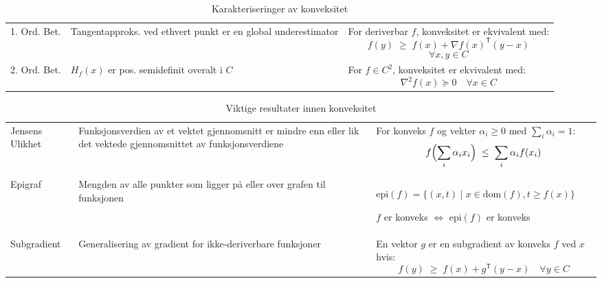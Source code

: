 \begin{table}[H]
	\centering
	\begin{tabular}{|p{3cm}|p{5cm}|p{6cm}|}
		\hline
		\rowcolor{rem-color!25}
		\multicolumn{3}{|l|}{\textbf{Karakteriseringer av Konveksitet}}                \\
		\hline
		\rowcolor{rem-color!5}
		1. Ord. Bet. & Tangentapproks. ved ethvert punkt er en global underestimator &
		For deriverbar \(f\), konveksitet er ekvivalent med:
		\[f(y)\;\ge\; f(x) + \nabla f(x)^\mathsf{T} (y - x)\]
		\[\forall x,y \in C\]                                                          \\
		\hline
		2. Ord. Bet. & \(H_f(x)\) er pos. semidefinit overalt i \(C\)                &
		For \(f \in C^2\), konveksitet er ekvivalent med:
		\[\nabla^2 f(x) \succeq 0\quad \forall x \in C\]                               \\
		\hline
	\end{tabular}
	\caption{Karakteriseringer av konveksitet}
	\label{tab:characterizations}
\end{table}

\begin{table}[H]
	\centering
	\begin{tabular}{|p{3cm}|p{5cm}|p{6cm}|}
		\hline
		\rowcolor{cor-color!25}
		\multicolumn{3}{|l|}{\textbf{Viktige Resultater}}                                                                                    \\
		\hline
		\rowcolor{cor-color!5}
		Jensens Ulikhet                                           & Funksjonsverdien av et vektet gjennomsnitt er mindre enn \newline
		eller lik det vektede gjennomsnittet av funksjonsverdiene &
		For konveks \(f\) og vekter \(\alpha_i \geq 0\) med \(\sum_i \alpha_i = 1\):
		\[f\Bigl(\sum_i \alpha_i x_i\Bigr)\;\le\;\sum_i \alpha_i f(x_i)\]                                                                    \\
		\hline
		Epigraf                                                   & Mengden av alle punkter som ligger på eller over grafen til funksjonen &
		\(\mathrm{epi}(f)=\{(x,t) \mid x\in\mathrm{dom}(f), t\ge f(x)\}\)

		\(f\) er konveks \(\Leftrightarrow\) \(\mathrm{epi}(f)\) er konveks                                                                  \\
		\hline
		\rowcolor{cor-color!5}
		Subgradient                                               & Generalisering av gradient for ikke-deriverbare funksjoner             &
		En vektor \(g\) er en subgradient av konveks \(f\) ved \(x\) hvis:
		\[f(y)\;\ge\; f(x) + g^\mathsf{T}(y-x)\quad \forall y \in C\]                                                                        \\
		\hline
	\end{tabular}
	\caption{Viktige resultater innen konveksitet}
	\label{tab:important_results}
\end{table}


